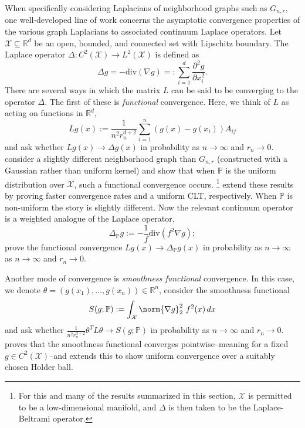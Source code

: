 \documentclass{article}
\newcommand{\Reals}{\mathbb{R}}
\newcommand{\1}{\mathbf{1}}
\newcommand{\Pbb}{\mathbb{P}}
\newcommand{\dive}{\mathrm{div}}
\theoremstyle{alden}
\theoremstyle{aldenthm}
\theoremstyle{definition}
\theoremstyle{remark}
\begin{document}
When specifically considering Laplacians of neighborhood graphs such as $G_{n,r}$, one well-developed line of work concerns the asymptotic convergence properties of the various graph Laplacians to associated continuum Laplace operators. Let $\mathcal{X} \subseteq \Reals^d$ be an open, bounded, and connected set with Lipschitz boundary. The Laplace operator $\Delta: C^2(\mathcal{X}) \to L^2(\mathcal{X})$ is defined as
\begin{equation*}
\Delta g = - \dive(\nabla g) =: \sum_{i = 1}^{d} \frac{\partial^2 g}{\partial x_i^2}.
\end{equation*}
There are several ways in which the matrix $L$ can be said to be converging to the operator $\Delta$. The first of these is \emph{functional} convergence. Here, we think of $L$ as acting on functions in $\Reals^d$,
\begin{equation*}
Lg(x) := \frac{1}{n^2r_n^{d+2}}\sum_{i = 1}^{n}(g(x) - g(x_i))A_{ij}
\end{equation*}
and ask whether $Lg(x) \to \Delta g(x)$ in probability as $n \to \infty$ and $r_n \to 0$.  \citet{belkin03,belkin05} consider a slightly different neighborhood graph than $G_{n,r}$ (constructed with a Gaussian rather than uniform kernel) and show that when $\Pbb$ is the uniform distribution over $\mathcal{X}$, such a functional convergence occurs. \footnote{For this and many of the results summarized in this section, $\mathcal{X}$ is permitted to be a low-dimensional manifold, and $\Delta$ is then taken to be the Laplace-Beltrami operator.} \citet{singer06,gine06} extend these results by proving faster convergence rates and a uniform CLT, respectively. When $\Pbb$ is non-uniform the story is slightly different. Now the relevant continuum operator is a weighted analogue of the Laplace operator,
\begin{equation*}
\Delta_{\Pbb} g := - \frac{1}{f} \dive(f^2 \nabla g);
\end{equation*}
\citet{lafon04,hein05} prove the functional convergence $Lg(x) \to \Delta_{\Pbb} g(x)$ in probability as $n \to \infty$ as $n \to \infty$ and $r_n \to 0$.

Another mode of convergence is \emph{smoothness functional} convergence. In this case, we denote $\theta = (g(x_1),\ldots,g(x_n)) \in \Reals^n$, consider the smoothness functional
\begin{equation*}
S(g;\Pbb) := \int_{\mathcal{X}} \norm{\nabla g}_2^2~ f^2(x) \,dx
\end{equation*}
and ask whether $\frac{1}{n^2r_n^{d+2}}\theta^T L \theta \to S(g;\Pbb)$ in probability as $n \to \infty$ and $r_n \to 0$. \citet{bousquet03} proves that the smoothness functional converges pointwise--meaning for a fixed $g \in C^2(\mathcal{X})$--and \citet{hein06} extends this to show uniform convergence over a suitably chosen Holder ball.
\end{document}
